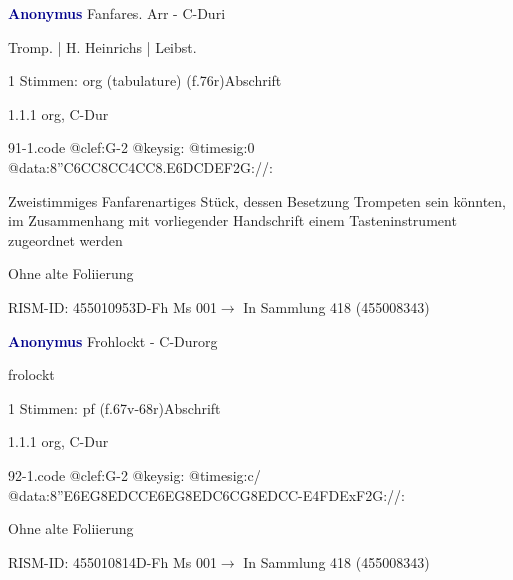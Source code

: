 \documentclass[twocolumn]{book}
\begin{document}
\par \vspace{7pt} \textcolor{darkblue}{\textbf{Anonymus  }}\hfillplus{\textbf{[91]}}\newline Fanfares. Arr - C-Dur\newline i
\par \begin{itshape}[f.76r, at left:] Tromp. | H. Heinrichs | Leibst.\end{itshape} 
\par \textcolor{darkblue}{}  1 Stimmen: org (tabulature)  (f.76r)\newline Abschrift
\par 1.1.1  org, C-Dur  
\begin{filecontents*}{91-1.code}
@clef:G-2
@keysig:
@timesig:0
@data:{8''C6CC8CC}4CC{8.E6D}{CDEF}2G://:
\end{filecontents*}
\newline
%
\par Zweistimmiges Fanfarenartiges Stück, dessen Besetzung Trompeten sein könnten, im Zusammenhang mit vorliegender Handschrift einem Tasteninstrument zugeordnet werden
\par Ohne alte Foliierung
\par RISM-ID: 455010953\newline D-Fh  Ms 001\newline $\rightarrow$ In Sammlung 418 (455008343)
      
\par \vspace{7pt} \textcolor{darkblue}{\textbf{Anonymus  }}\hfillplus{\textbf{[92]}}\newline Frohlockt - C-Dur\newline org
\par \begin{itshape}[f.67v, at left:] frolockt\end{itshape} 
\par \textcolor{darkblue}{}  1 Stimmen: pf  (f.67v-68r)\newline Abschrift
\par 1.1.1  org, C-Dur  
\begin{filecontents*}{92-1.code}
@clef:G-2
@keysig:
@timesig:c/
@data:{8''E6EG8ED}{CC}{E6EG8ED}{C6CG8ED}{CC}-E4FDExF2G://:
\end{filecontents*}
\newline
%
\par Ohne alte Foliierung
\par RISM-ID: 455010814\newline D-Fh  Ms 001\newline $\rightarrow$ In Sammlung 418 (455008343)
      
\end{document}
